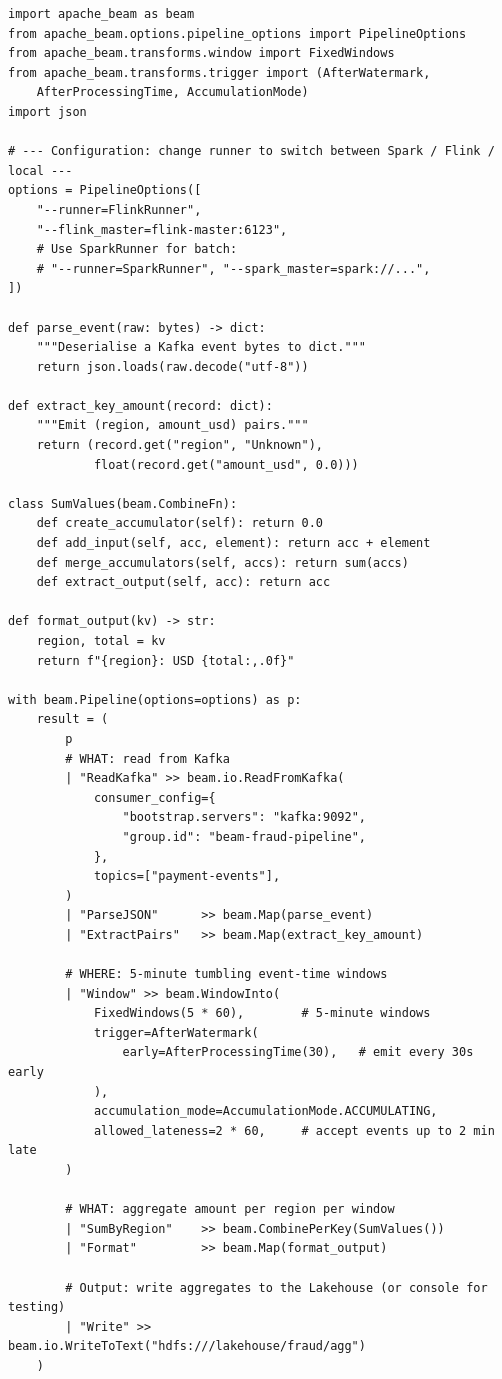 \begin{lstlisting}[style=pyspark, caption={Apache Beam: fraud detection
  pipeline with tumbling windows (same code runs on Spark or Flink)}]
import apache_beam as beam
from apache_beam.options.pipeline_options import PipelineOptions
from apache_beam.transforms.window import FixedWindows
from apache_beam.transforms.trigger import (AfterWatermark,
    AfterProcessingTime, AccumulationMode)
import json

# --- Configuration: change runner to switch between Spark / Flink / local ---
options = PipelineOptions([
    "--runner=FlinkRunner",
    "--flink_master=flink-master:6123",
    # Use SparkRunner for batch:
    # "--runner=SparkRunner", "--spark_master=spark://...",
])

def parse_event(raw: bytes) -> dict:
    """Deserialise a Kafka event bytes to dict."""
    return json.loads(raw.decode("utf-8"))

def extract_key_amount(record: dict):
    """Emit (region, amount_usd) pairs."""
    return (record.get("region", "Unknown"),
            float(record.get("amount_usd", 0.0)))

class SumValues(beam.CombineFn):
    def create_accumulator(self): return 0.0
    def add_input(self, acc, element): return acc + element
    def merge_accumulators(self, accs): return sum(accs)
    def extract_output(self, acc): return acc

def format_output(kv) -> str:
    region, total = kv
    return f"{region}: USD {total:,.0f}"

with beam.Pipeline(options=options) as p:
    result = (
        p
        # WHAT: read from Kafka
        | "ReadKafka" >> beam.io.ReadFromKafka(
            consumer_config={
                "bootstrap.servers": "kafka:9092",
                "group.id": "beam-fraud-pipeline",
            },
            topics=["payment-events"],
        )
        | "ParseJSON"      >> beam.Map(parse_event)
        | "ExtractPairs"   >> beam.Map(extract_key_amount)

        # WHERE: 5-minute tumbling event-time windows
        | "Window" >> beam.WindowInto(
            FixedWindows(5 * 60),        # 5-minute windows
            trigger=AfterWatermark(
                early=AfterProcessingTime(30),   # emit every 30s early
            ),
            accumulation_mode=AccumulationMode.ACCUMULATING,
            allowed_lateness=2 * 60,     # accept events up to 2 min late
        )

        # WHAT: aggregate amount per region per window
        | "SumByRegion"    >> beam.CombinePerKey(SumValues())
        | "Format"         >> beam.Map(format_output)

        # Output: write aggregates to the Lakehouse (or console for testing)
        | "Write" >> beam.io.WriteToText("hdfs:///lakehouse/fraud/agg")
    )
\end{lstlisting}

